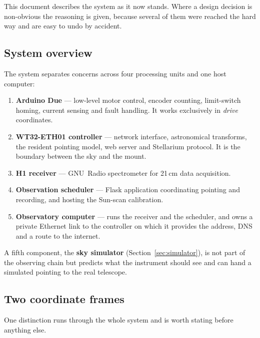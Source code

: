 \documentclass[11pt,a4paper]{article}
\begin{document}
This document describes the system as it now stands. Where a design decision is non-obvious the reasoning is given, because several of them were reached the hard way and are easy to undo by accident.

\subsection{System overview}

The system separates concerns across four processing units and one host computer:

\begin{enumerate}
    \item \textbf{Arduino Due} --- low-level motor control, encoder counting, limit-switch homing, current sensing and fault handling. It works exclusively in \emph{drive} coordinates.
    \item \textbf{WT32-ETH01 controller} --- network interface, astronomical transforms, the resident pointing model, web server and Stellarium protocol. It is the boundary between the sky and the mount.
    \item \textbf{H1 receiver} --- GNU~Radio spectrometer for 21\,cm data acquisition.
    \item \textbf{Observation scheduler} --- Flask application coordinating pointing and recording, and hosting the Sun-scan calibration.
    \item \textbf{Observatory computer} --- runs the receiver and the scheduler, and owns a private Ethernet link to the controller on which it provides the address, DNS and a route to the internet.
\end{enumerate}

A fifth component, the \textbf{sky simulator} (Section~\ref{sec:simulator}), is not part of the observing chain but predicts what the instrument should see and can hand a simulated pointing to the real telescope.

\subsection{Two coordinate frames}
\label{sec:two-frames}

One distinction runs through the whole system and is worth stating before anything else.
\end{document}
